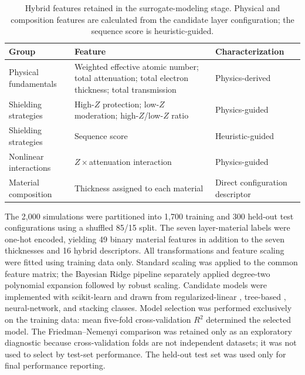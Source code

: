 \documentclass[preprint,12pt]{elsarticle}
\begin{document}
\begin{table}[htbp]
\centering\small
\caption{Hybrid features retained in the surrogate-modeling stage. Physical and composition features are calculated from the candidate layer configuration; the sequence score is heuristic-guided.}
\label{tab:features}
\begin{tabular}{lll}
\toprule
Group & Feature & Characterization\\
\midrule
Physical fundamentals & Weighted effective atomic number; total attenuation; total electron thickness; total transmission & Physics-derived\\
Shielding strategies & High-$Z$ protection; low-$Z$ moderation; high-$Z$/low-$Z$ ratio & Physics-guided\\
Shielding strategies & Sequence score & Heuristic-guided\\
Nonlinear interactions & $Z\times$attenuation interaction & Physics-guided\\
Material composition & Thickness assigned to each material & Direct configuration descriptor\\
\bottomrule
\end{tabular}
\end{table}

The 2,000 simulations were partitioned into 1,700 training and 300 held-out test configurations using a shuffled 85/15 split. The seven layer-material labels were one-hot encoded, yielding 49 binary material features in addition to the seven thicknesses and 16 hybrid descriptors. All transformations and feature scaling were fitted using training data only. Standard scaling was applied to the common feature matrix; the Bayesian Ridge pipeline separately applied degree-two polynomial expansion followed by robust scaling. Candidate models were implemented with scikit-learn \citep{Pedregosa2011} and drawn from regularized-linear \citep{MacKay1992,Zou2005,Wold2001}, tree-based \citep{Breiman2001,Friedman2001,ChenGuestrin2016,Ke2017}, neural-network, and stacking \citep{Wolpert1992} classes. Model selection was performed exclusively on the training data: mean five-fold cross-validation $R^2$ determined the selected model. The Friedman--Nemenyi comparison \citep{Demsar2006} was retained only as an exploratory diagnostic because cross-validation folds are not independent datasets; it was not used to select by test-set performance. The held-out test set was used only for final performance reporting.
\end{document}
